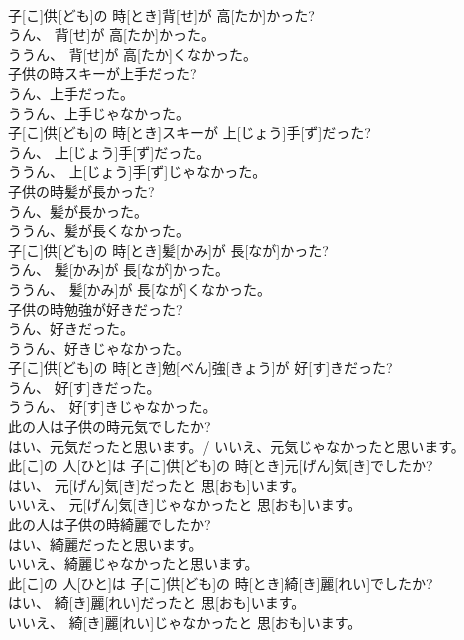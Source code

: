 \documentclass[8pt]{extreport}
\begin{document}
\begin{CJK}{UTF8}{min}
\\	子[こ]供[ども]の 時[とき]背[せ]が 高[たか]かった? 
\\	うん、 背[せ]が 高[たか]かった。 
\\	ううん、 背[せ]が 高[たか]くなかった。
\\	子供の時スキーが上手だった? 
\\	うん、上手だった。 
\\	ううん、上手じゃなかった。	
\\	子[こ]供[ども]の 時[とき]スキーが 上[じょう]手[ず]だった? 
\\	うん、 上[じょう]手[ず]だった。 
\\	ううん、 上[じょう]手[ず]じゃなかった。
\\	子供の時髪が長かった? 
\\	うん、髪が長かった。 
\\	ううん、髪が長くなかった。	
\\	子[こ]供[ども]の 時[とき]髪[かみ]が 長[なが]かった? 
\\	うん、 髪[かみ]が 長[なが]かった。 
\\	ううん、 髪[かみ]が 長[なが]くなかった。
\\	子供の時勉強が好きだった? 
\\	うん、好きだった。 
\\	ううん、好きじゃなかった。	
\\	子[こ]供[ども]の 時[とき]勉[べん]強[きょう]が 好[す]きだった? 
\\	うん、 好[す]きだった。 
\\	ううん、 好[す]きじゃなかった。
\\	此の人は子供の時元気でしたか? 
\\	はい、元気だったと思います。/ いいえ、元気じゃなかったと思います。	
\\	此[こ]の 人[ひと]は 子[こ]供[ども]の 時[とき]元[げん]気[き]でしたか? 
\\	はい、 元[げん]気[き]だったと 思[おも]います。 
\\	いいえ、 元[げん]気[き]じゃなかったと 思[おも]います。
\\	此の人は子供の時綺麗でしたか? 
\\	はい、綺麗だったと思います。 
\\	いいえ、綺麗じゃなかったと思います。	
\\	此[こ]の 人[ひと]は 子[こ]供[ども]の 時[とき]綺[き]麗[れい]でしたか? 
\\	はい、 綺[き]麗[れい]だったと 思[おも]います。 
\\	いいえ、 綺[き]麗[れい]じゃなかったと 思[おも]います。

\end{CJK}
\end{document}
